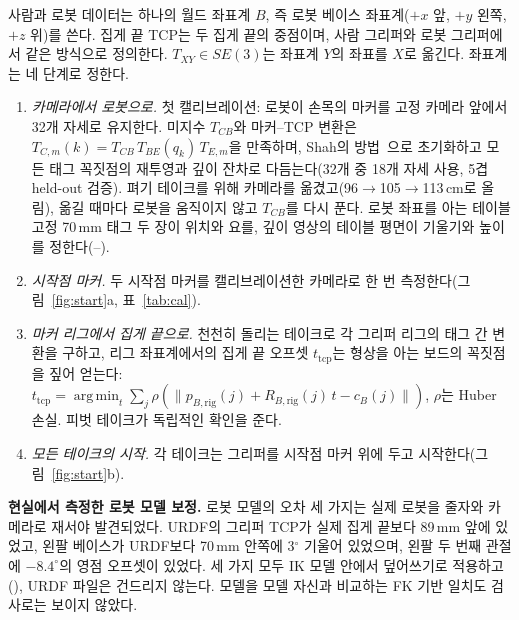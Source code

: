 \documentclass[conference,10pt]{IEEEtran}
\newcommand{\mm}{\,mm\xspace}
\DeclareMathOperator*{\argmin}{arg\,min}
\begin{document}
사람과 로봇 데이터는 하나의 월드 좌표계 $B$, 즉 로봇 베이스 좌표계($+x$ 앞, $+y$ 왼쪽, $+z$ 위)를 쓴다. 집게 끝 TCP는 두 집게
끝의 중점이며, 사람 그리퍼와 로봇 그리퍼에서 같은 방식으로 정의한다. $T_{XY}\in SE(3)$는 좌표계 $Y$의 좌표를 $X$로 옮긴다.
좌표계는 네 단계로 정한다.
\begin{enumerate}
\item \emph{카메라에서 로봇으로.} 첫 캘리브레이션: 로봇이 손목의 마커를 고정 카메라 앞에서 32개 자세로 유지한다. 미지수
  $T_{CB}$와 마커--TCP 변환은 $T_{C,m}(k)=T_{CB}\,T_{BE}(q_k)\,T_{E,m}$을 만족하며, Shah의 방법~\cite{shah2013robotworld}으로
  초기화하고 모든 태그 꼭짓점의 재투영과 깊이 잔차로 다듬는다(32개 중 18개 자세 사용, 5겹 held-out 검증). 펴기 테이크를 위해
  카메라를 옮겼고(96$\to$105$\to$113\,cm로 올림), 옮길 때마다 로봇을 움직이지 않고 $T_{CB}$를 다시 푼다. 로봇 좌표를 아는 테이블
  고정 70\mm 태그 두 장이 위치와 요를, 깊이 영상의 테이블 평면이 기울기와 높이를 정한다(--).
\item \emph{시작점 마커.} 두 시작점 마커를 캘리브레이션한 카메라로 한 번 측정한다(그림~\ref{fig:start}a, 표~\ref{tab:cal}).
\item \emph{마커 리그에서 집게 끝으로.} 천천히 돌리는 테이크로 각 그리퍼 리그의 태그 간 변환을 구하고, 리그 좌표계에서의 집게 끝
  오프셋 $t_\mathrm{tcp}$는 형상을 아는 보드의 꼭짓점을 짚어 얻는다:
  $t_\mathrm{tcp}=\argmin_t\sum_j\rho(\lVert p_{B,\mathrm{rig}}(j)+R_{B,\mathrm{rig}}(j)\,t-c_B(j)\rVert)$, $\rho$는 Huber 손실.
  피벗 테이크가 독립적인 확인을 준다.
\item \emph{모든 테이크의 시작.} 각 테이크는 그리퍼를 시작점 마커 위에 두고 시작한다(그림~\ref{fig:start}b).
\end{enumerate}

\textbf{현실에서 측정한 로봇 모델 보정.} 로봇 모델의 오차 세 가지는 실제 로봇을 줄자와 카메라로 재서야 발견되었다. URDF의 그리퍼
TCP가 실제 집게 끝보다 89\mm 앞에 있었고, 왼팔 베이스가 URDF보다 70\mm 안쪽에 3$^\circ$ 기울어 있었으며, 왼팔 두 번째 관절에
$-8.4^\circ$의 영점 오프셋이 있었다. 세 가지 모두 IK 모델 안에서 덮어쓰기로 적용하고(), URDF 파일은 건드리지
않는다. 모델을 모델 자신과 비교하는 FK 기반 일치도 검사로는 보이지 않았다.
\end{document}
